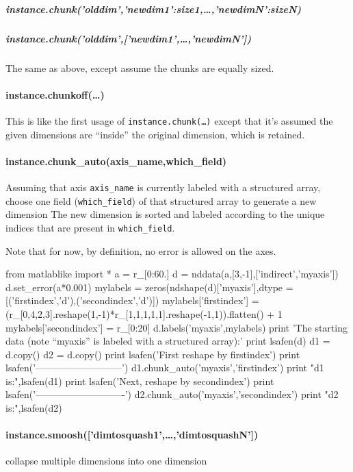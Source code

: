 \subparagraph{instance.chunk('olddim',{'newdim1':size1,\ldots,'newdimN':sizeN})}

\subparagraph{instance.chunk('olddim',['newdim1',\ldots,'newdimN'])}
The same as above, except assume the chunks are equally sized.
\paragraph{instance.chunkoff(\ldots)}
This is like the first usage of \texttt{instance.chunk(\ldots)} except that it's assumed the given dimensions are ``inside'' the original dimension, which is retained.
\paragraph{instance.chunk\_auto(axis\_name,which\_field)}
Assuming that axis \texttt{axis\_name} is currently labeled with a structured array, choose one field (\texttt{which\_field}) of that structured array to generate a new dimension
The new dimension is sorted and labeled according to the unique indices that are present in \texttt{which\_field}.

Note that for now, by definition, no error is allowed on the axes.

\begin{python}[on]
from matlablike import *
a = r_[0:60.]
d = nddata(a,[3,-1],['indirect','myaxis'])
d.set_error(a*0.001)
mylabels = zeros(ndshape(d)['myaxis'],dtype = [('firstindex','d'),('secondindex','d')])
mylabels['firstindex'] = (r_[0,4,2,3].reshape(1,-1)*r_[1,1,1,1,1].reshape(-1,1)).flatten() + 1
mylabels['secondindex'] = r_[0:20]
d.labels('myaxis',mylabels)
print 'The starting data (note ``myaxis'' is labeled with a structured array):\n\n'
print lsafen(d)
d1 = d.copy()
d2 = d.copy()
print lsafen('First reshape by firstindex')
print lsafen('---------------------------')
d1.chunk_auto('myaxis','firstindex')
print "d1 is:",lsafen(d1)
print lsafen('Next, reshape by secondindex')
print lsafen('----------------------------')
d2.chunk_auto('myaxis','secondindex')
print "d2 is:",lsafen(d2)
\end{python}

\paragraph{instance.smoosh(['dimtosquash1',\ldots,'dimtosquashN'])}
collapse multiple dimensions into one dimension

